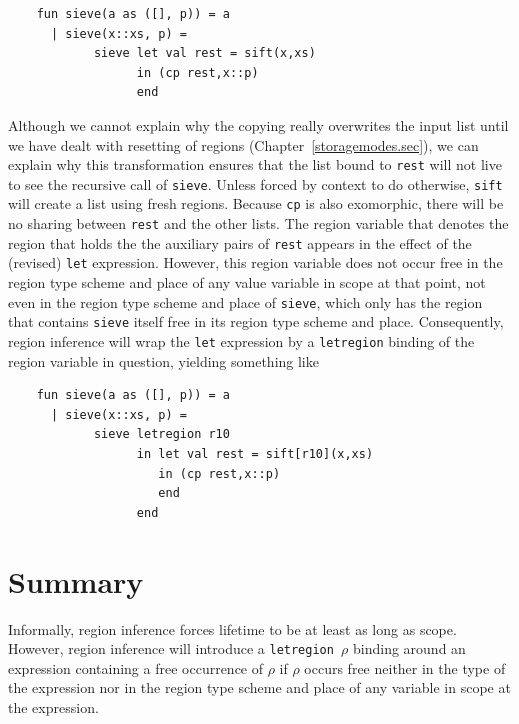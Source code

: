 \documentclass[12pt]{book}
\begin{document}
\begin{verbatim}
    fun sieve(a as ([], p)) = a
      | sieve(x::xs, p) = 
            sieve let val rest = sift(x,xs)
                  in (cp rest,x::p)
                  end
\end{verbatim}
Although we cannot explain why the copying really overwrites the input
list until we have dealt with resetting of regions (Chapter~\ref{storagemodes.sec}),
we can explain why this transformation ensures that the list bound to
{\tt rest} will not live to see the recursive call of {\tt sieve}.
Unless forced by context to do otherwise, {\tt sift} 
will create a list using fresh regions. Because {\tt cp} is also exomorphic,
there will be no sharing between {\tt rest} and the other lists. The region variable that denotes the region that holds the 
the auxiliary pairs of {\tt rest} appears in the effect of the
(revised) {\tt let} expression. However, this region variable does not occur free in the
region type scheme and place of any value variable in scope at that point, not
even in the region type scheme and place of {\tt sieve}, which only has the region that
contains {\tt sieve} itself free in its region type scheme and place. Consequently, region inference will wrap
the {\tt let} expression by a {\tt letregion} binding of the region
variable in question, yielding something like
\begin{verbatim}
    fun sieve(a as ([], p)) = a
      | sieve(x::xs, p) = 
            sieve letregion r10
                  in let val rest = sift[r10](x,xs)
                     in (cp rest,x::p)
                     end
                  end
\end{verbatim}
\section{Summary}
Informally, region inference forces lifetime to be at least as long as
scope. However, region inference will introduce a {\tt letregion $\rho$} binding
around an expression containing a free occurrence of $\rho$ 
if $\rho$ occurs free neither in the type of
the expression nor in the region type scheme and place of any variable
in scope at the expression.
\end{document}
